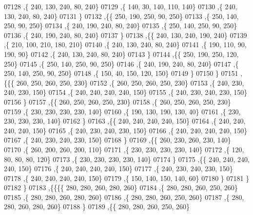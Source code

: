 \begin{DoxyCode}
07128     ,\{   240,   130,   240,    80,   240\}
07129     ,\{   140,    30,   140,   110,   140\}
07130     ,\{   240,   130,   240,    80,   240\}
07131     \}
07132    ,\{\{   250,   190,   250,    90,   250\}
07133     ,\{   250,   140,   250,    90,   250\}
07134     ,\{   240,   190,   240,    80,   240\}
07135     ,\{   250,   140,   250,    90,   250\}
07136     ,\{   240,   190,   240,    80,   240\}
07137     \}
07138    ,\{\{   240,   130,   240,   190,   240\}
07139     ,\{   210,   100,   210,   180,   210\}
07140     ,\{   240,   130,   240,    80,   240\}
07141     ,\{   190,   110,    90,   190,    90\}
07142     ,\{   240,   130,   240,    80,   240\}
07143     \}
07144    ,\{\{   250,   190,   250,   120,   250\}
07145     ,\{   250,   140,   250,    90,   250\}
07146     ,\{   240,   190,   240,    80,   240\}
07147     ,\{   250,   140,   250,    90,   250\}
07148     ,\{   150,    40,   150,   120,   150\}
07149     \}
07150    \}
07151   ,\{\{\{   260,   250,   260,   250,   230\}
07152     ,\{   260,   250,   260,   250,   230\}
07153     ,\{   240,   230,   240,   230,   150\}
07154     ,\{   240,   240,   240,   240,   150\}
07155     ,\{   240,   230,   240,   230,   150\}
07156     \}
07157    ,\{\{   260,   250,   260,   250,   230\}
07158     ,\{   260,   250,   260,   250,   230\}
07159     ,\{   230,   230,   230,   230,   140\}
07160     ,\{   190,   130,   190,   130,    40\}
07161     ,\{   230,   230,   230,   230,   140\}
07162     \}
07163    ,\{\{   240,   240,   240,   240,   150\}
07164     ,\{   240,   240,   240,   240,   150\}
07165     ,\{   240,   230,   240,   230,   150\}
07166     ,\{   240,   240,   240,   240,   150\}
07167     ,\{   240,   230,   240,   230,   150\}
07168     \}
07169    ,\{\{   260,   230,   260,   230,   140\}
07170     ,\{   260,   200,   260,   200,   110\}
07171     ,\{   230,   230,   230,   230,   140\}
07172     ,\{   120,    80,    80,    80,   120\}
07173     ,\{   230,   230,   230,   230,   140\}
07174     \}
07175    ,\{\{   240,   240,   240,   240,   150\}
07176     ,\{   240,   240,   240,   240,   150\}
07177     ,\{   240,   230,   240,   230,   150\}
07178     ,\{   240,   240,   240,   240,   150\}
07179     ,\{   150,   140,   150,   140,    60\}
07180     \}
07181    \}
07182   \}
07183  ,\{\{\{\{   280,   280,   260,   280,   260\}
07184     ,\{   280,   280,   260,   250,   260\}
07185     ,\{   280,   280,   260,   280,   260\}
07186     ,\{   280,   280,   260,   250,   260\}
07187     ,\{   280,   280,   260,   280,   260\}
07188     \}
07189    ,\{\{   280,   280,   260,   250,   260\}

\end{DoxyCode}
